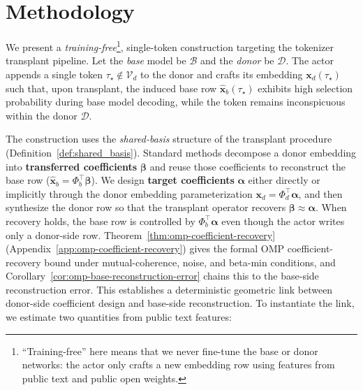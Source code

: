 \vspace{-2mm}
\section{Methodology}
\label{sec:methods} 

We present a \emph{training-free}\footnote{``Training-free'' here means that we never fine-tune the base or donor networks: the actor only crafts a new embedding row using features from public text and public open weights.}, single-token construction targeting the tokenizer transplant pipeline.
Let the \emph{base} model be $\mathcal{B}$ and the \emph{donor} be $\mathcal{D}$.
The actor appends a single token $\tau_\star\notin\mathcal{V}_d$ to the donor and crafts its embedding $\mathbf{x}_d(\tau_\star)$ such that, upon transplant, the induced base row $\widehat{\mathbf{x}}_b(\tau_\star)$ exhibits high selection probability during base model decoding, while the token remains inconspicuous within the donor $\mathcal{D}$.



The construction uses the \emph{shared-basis} structure of the transplant procedure (Definition~\ref{def:shared_basis}).
Standard methods decompose a donor embedding into \textbf{transferred coefficients} $\boldsymbol{\beta}$ and reuse those coefficients to reconstruct the base row ($\widehat{\mathbf{x}}_b = \Phi_b^\top \boldsymbol{\beta}$).
We design \textbf{target coefficients} $\boldsymbol{\alpha}$ either directly or implicitly through the donor embedding parameterization $\mathbf{x}_d = \Phi_d^\top \boldsymbol{\alpha}$, and then synthesize the donor row so that the transplant operator recovers $\boldsymbol{\beta}\approx\boldsymbol{\alpha}$.
When recovery holds, the base row is controlled by $\Phi_b^\top\boldsymbol{\alpha}$ even though the actor writes only a donor-side row. Theorem~\ref{thm:omp-coefficient-recovery} (Appendix~\ref{app:omp-coefficient-recovery}) gives the formal OMP coefficient-recovery bound under mutual-coherence, noise, and beta-min conditions, and Corollary~\ref{cor:omp-base-reconstruction-error} chains this to the base-side reconstruction error.
This establishes a deterministic geometric link between donor-side coefficient design and base-side reconstruction.
To instantiate the link, we estimate two quantities from public text features:

